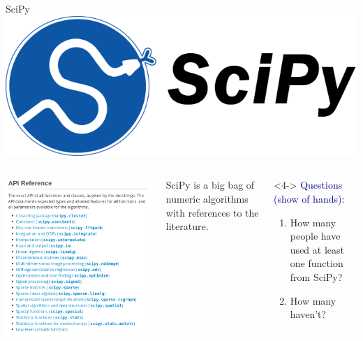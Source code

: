\documentclass[aspectratio=169]{beamer}
\begin{document}
\begin{frame}{SciPy}
\vspace{0.35 cm}
\hfill \includegraphics[height=1 cm]{scipy-logo.png}

\vspace{-1 cm}
\begin{columns}[b]
\includegraphics[width=\linewidth]{scipy-docs.png}

SciPy is a big bag of numeric algorithms with references to the literature.

\vspace{0.2 cm}

\vspace{0.2 cm}

\vspace{0.5 cm}
\begin{uncoverenv}<4->
\small
\textcolor{darkblue}{Questions (show of hands):}
\vspace{-0.2 cm}
\begin{enumerate}\setlength{\itemsep}{-0.1 cm}
\item How many people have used at least one function from SciPy?
\item How many haven't?
\end{enumerate}
\end{uncoverenv}
\vspace{0.05 cm}
\end{columns}
\end{frame}
\end{document}
